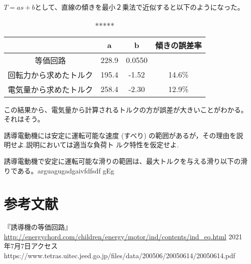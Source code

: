 \documentclass{ltjsarticle}
\begin{document}
$T = as + b$として、直線の傾きを最小２乗法で近似すると以下のようになった。

\begin{table}[H]
    \begin{center}
        \begin{tabular}{|c|c|c|c|} \hline            
            & a & b & 傾きの誤差率\\ \hline
            等価回路 & 228.9 & 0.0550 &  \\ \hline
            回転力から求めたトルク & 195.4 & -1.52 & 14.6\% \\ \hline
            電気量から求めたトルク & 258.4 & -2.30 & 12.9\% \\ \hline
        \end{tabular}
        \caption{*****}
    \end{center}
\end{table}

この結果から、電気量から計算されるトルクの方が誤差が大きいことがわかる。それはそう。

誘導電動機には安定に運転可能な速度 (すべり) の範囲があるが，その理由を説明せよ.説明においては適当な負荷ト
ルク特性を仮定せよ.

誘導電動機で安定に運転可能な滑りの範囲は、最大トルクを与える滑り以下の滑りである。arguagugadgaivfdfsdf gEg



\section{参考文献}
『誘導機の等価回路』\url{http://energychord.com/children/energy/motor/ind/contents/ind_eq.html} 2021年7月7日アクセス
https://www.tetras.uitec.jeed.go.jp/files/data/200506/20050614/20050614.pdf
\end{document}
